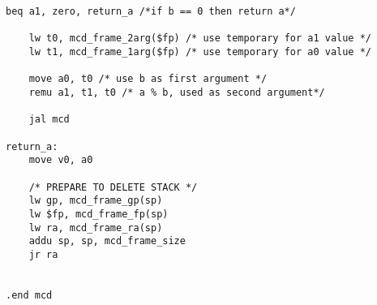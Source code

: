 \documentclass[a4paper,10pt]{article}
\begin{document}
\begin{lstlisting}[style=mips]
    beq a1, zero, return_a /*if b == 0 then return a*/

    lw t0, mcd_frame_2arg($fp) /* use temporary for a1 value */
    lw t1, mcd_frame_1arg($fp) /* use temporary for a0 value */

    move a0, t0 /* use b as first argument */
    remu a1, t1, t0 /* a % b, used as second argument*/
    
    jal mcd

return_a: 
    move v0, a0

    /* PREPARE TO DELETE STACK */
    lw gp, mcd_frame_gp(sp)
    lw $fp, mcd_frame_fp(sp)
    lw ra, mcd_frame_ra(sp)
    addu sp, sp, mcd_frame_size
    jr ra


.end mcd

\end{lstlisting}


\end{document}
